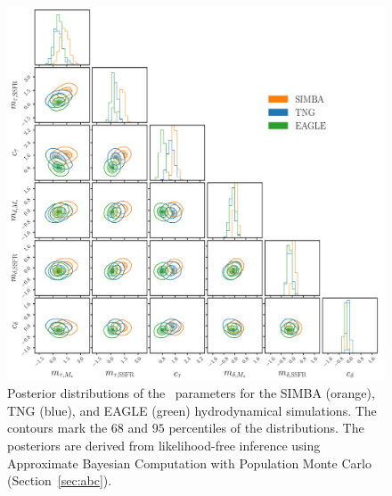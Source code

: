 \begin{figure}
\begin{center}
    \includegraphics[width=\textwidth]{figs/abc.pdf}
    \caption{\label{fig:abc}
    Posterior distributions of the \eda~parameters for the SIMBA (orange), TNG
    (blue), and EAGLE (green) hydrodynamical simulations. The contours mark the $68$
    and $95$ percentiles of the distributions. The posteriors are derived from 
    likelihood-free inference using Approximate Bayesian Computation with
    Population Monte Carlo (Section~\ref{sec:abc}). 
    }
\end{center}
\end{figure}

